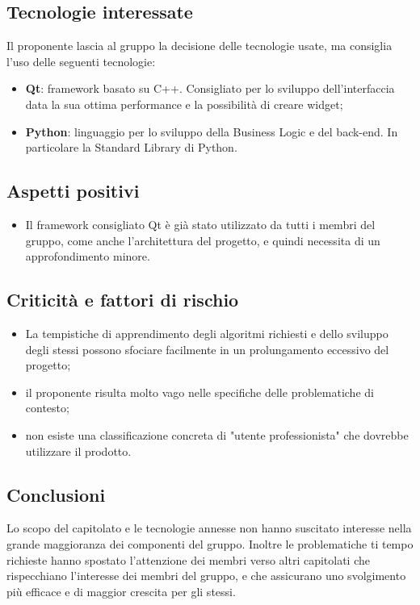 \subsection{Tecnologie interessate}
Il proponente lascia al gruppo la decisione delle tecnologie usate, ma consiglia l'uso delle seguenti tecnologie:
\begin{itemize}
    \item \textbf{Qt}: framework basato su C++. Consigliato per lo sviluppo dell'interfaccia data la sua ottima performance e la possibilità di creare widget;
    \item \textbf{Python}: linguaggio per lo sviluppo della Business Logic e del back-end. In particolare la Standard Library di Python.
\end{itemize}
\subsection{Aspetti positivi}
\begin{itemize}
    \item Il framework consigliato Qt è già stato utilizzato da tutti i membri del gruppo, come anche l'architettura del progetto, e quindi necessita di un approfondimento minore.
\end{itemize}
\subsection{Criticità e fattori di rischio}
\begin{itemize}
    \item La tempistiche di apprendimento degli algoritmi richiesti e dello sviluppo degli stessi possono sfociare facilmente in un prolungamento eccessivo del progetto;
    \item il proponente risulta molto vago nelle specifiche delle problematiche di contesto;
    \item non esiste una classificazione concreta di "utente professionista" che dovrebbe utilizzare il prodotto.
\end{itemize}
\subsection{Conclusioni}
Lo scopo del capitolato e le tecnologie annesse non hanno suscitato interesse nella grande maggioranza dei componenti del gruppo. Inoltre le problematiche ti tempo richieste hanno spostato l'attenzione dei membri verso altri capitolati che rispecchiano l'interesse dei membri del gruppo, e che assicurano uno svolgimento più efficace e di maggior crescita per gli stessi.